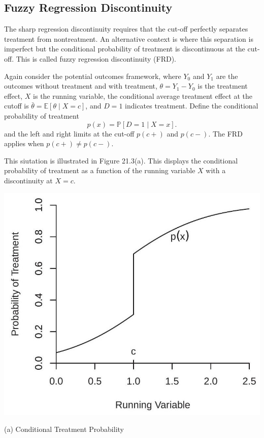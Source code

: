 \documentclass[10pt]{article}
\begin{document}
\subsection{Fuzzy Regression Discontinuity}
The sharp regression discontinuity requires that the cut-off perfectly separates treatment from nontreatment. An alternative context is where this separation is imperfect but the conditional probability of treatment is discontinuous at the cut-off. This is called fuzzy regression discontinuity (FRD).

Again consider the potential outcomes framework, where $Y_{0}$ and $Y_{1}$ are the outcomes without treatment and with treatment, $\theta=Y_{1}-Y_{0}$ is the treatment effect, $X$ is the running variable, the conditional average treatment effect at the cutoff is $\bar{\theta}=\mathbb{E}[\theta \mid X=c]$, and $D=1$ indicates treatment. Define the conditional probability of treatment
$$
p(x)=\mathbb{P}[D=1 \mid X=x] .
$$
and the left and right limits at the cut-off $p(c+)$ and $p(c-)$. The FRD applies when $p(c+) \neq p(c-)$.

This siutation is illustrated in Figure 21.3(a). This displays the conditional probability of treatment as a function of the running variable $X$ with a discontinuity at $X=c$.

\includegraphics[max width=\textwidth]{2022_10_23_bb8a8d8a5dc56cf142a9g-11}

(a) Conditional Treatment Probability
\end{document}
